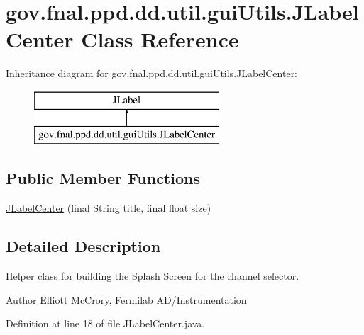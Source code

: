 \hypertarget{classgov_1_1fnal_1_1ppd_1_1dd_1_1util_1_1guiUtils_1_1JLabelCenter}{\section{gov.\-fnal.\-ppd.\-dd.\-util.\-gui\-Utils.\-J\-Label\-Center Class Reference}
\label{classgov_1_1fnal_1_1ppd_1_1dd_1_1util_1_1guiUtils_1_1JLabelCenter}
}
Inheritance diagram for gov.\-fnal.\-ppd.\-dd.\-util.\-gui\-Utils.\-J\-Label\-Center\-:\begin{figure}[H]
\begin{center}
\leavevmode
\includegraphics[height=2.000000cm]{classgov_1_1fnal_1_1ppd_1_1dd_1_1util_1_1guiUtils_1_1JLabelCenter}
\end{center}
\end{figure}
\subsection*{Public Member Functions}
\begin{DoxyCompactItemize}
\item 
\hyperlink{classgov_1_1fnal_1_1ppd_1_1dd_1_1util_1_1guiUtils_1_1JLabelCenter_a2af9e08fe6f52968846dd960a16d1026}{J\-Label\-Center} (final String title, final float size)
\end{DoxyCompactItemize}


\subsection{Detailed Description}
Helper class for building the Splash Screen for the channel selector.

\begin{DoxyAuthor}{Author}
Elliott Mc\-Crory, Fermilab A\-D/\-Instrumentation 
\end{DoxyAuthor}


Definition at line 18 of file J\-Label\-Center.\-java.



